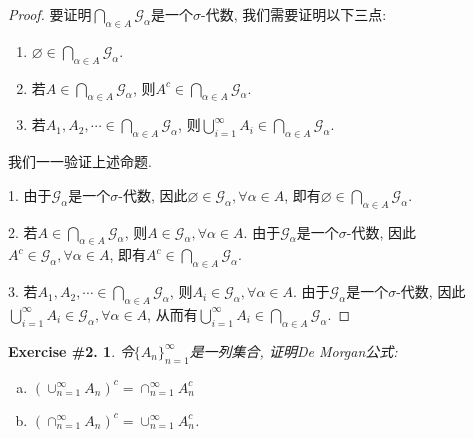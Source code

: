 \documentclass[UTF8, a4paper]{article}
\newtheorem{exercise}{Exercise \#2.}
\begin{document}
\begin{proof}

要证明\(\bigcap_{\alpha \in A} \mathcal{G}_\alpha\)是一个\(\sigma\)-代数, 我们需要证明以下三点:
\begin{enumerate}
    \item \(\varnothing \in \bigcap_{\alpha \in A} \mathcal{G}_\alpha\).
    \item 若\(A \in \bigcap_{\alpha \in A} \mathcal{G}_\alpha\), 则\(A^{c} \in \bigcap_{\alpha \in A} \mathcal{G}_\alpha\).
    \item 若\(A_1, A_2, \cdots \in \bigcap_{\alpha \in A} \mathcal{G}_\alpha\), 则\(\bigcup_{i=1}^{\infty} A_i \in \bigcap_{\alpha \in A} \mathcal{G}_\alpha\).
\end{enumerate}
我们一一验证上述命题.

1. 由于\(\mathcal{G}_\alpha\)是一个\(\sigma\)-代数, 因此\(\varnothing \in \mathcal{G}_\alpha, \forall \alpha \in A\), 即有\(\varnothing \in \bigcap_{\alpha \in A} \mathcal{G}_\alpha\).

2. 若\(A \in \bigcap_{\alpha \in A} \mathcal{G}_\alpha\), 则\(A \in \mathcal{G}_\alpha, \forall \alpha \in A\). 由于\(\mathcal{G}_\alpha\)是一个\(\sigma\)-代数, 因此\(A^{c} \in \mathcal{G}_\alpha, \forall \alpha \in A\), 即有\(A^{c} \in \bigcap_{\alpha \in A} \mathcal{G}_\alpha\).

3. 若\(A_1, A_2, \cdots \in \bigcap_{\alpha \in A} \mathcal{G}_\alpha\), 则\(A_i \in \mathcal{G}_\alpha, \forall \alpha \in A\). 由于\(\mathcal{G}_\alpha\)是一个\(\sigma\)-代数, 因此\(\bigcup_{i=1}^{\infty} A_i \in \mathcal{G}_\alpha, \forall \alpha \in A\), 从而有\(\bigcup_{i=1}^{\infty} A_i \in \bigcap_{\alpha \in A} \mathcal{G}_\alpha\).

\end{proof}


\begin{framed}
\begin{exercise}
令\(\{A_n\}_{n=1}^{\infty}\)是一列集合, 证明De Morgan公式:
\begin{enumerate}[a)]
    \item \(\left(\cup_{n=1}^{\infty} A_n\right)^c  =\cap_{n=1}^{\infty} A_n^c\)
    \item \(\left(\cap_{n=1}^{\infty} A_n\right)^c  =\cup_{n=1}^{\infty} A_n^c\).
\end{enumerate}
\end{exercise}
\end{framed}
\end{document}
